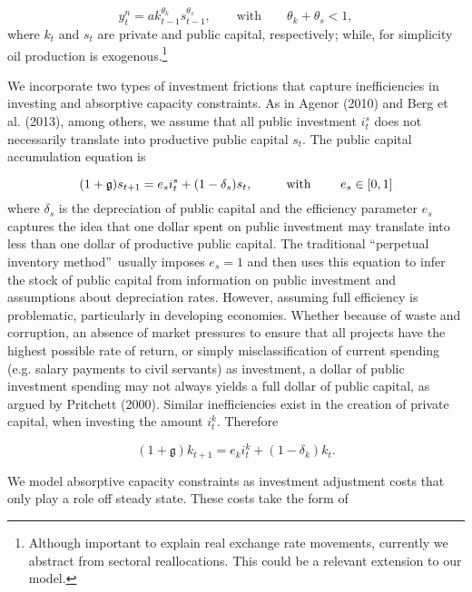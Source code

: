 \documentclass[11pt]{article}
\begin{document}
\begin{equation}
y_{t}^{n}=ak_{t-1}^{\theta _{k}}s_{t-1}^{\theta _{s}},\qquad \text{with}%
\qquad \theta _{k}+\theta _{s}<1,  \label{2}
\end{equation}%
where $k_{t}$ and $s_{t}$ are private and public capital, respectively;
while, for simplicity oil production is exogenous.\footnote{%
Although important to explain real exchange rate movements, currently we
abstract from sectoral reallocations. This could be a relevant extension to
our model.}

We incorporate two types of investment frictions that capture inefficiencies
in investing and absorptive capacity constraints. As in Agenor (2010) and
Berg et al. (2013), among others, we assume that all public investment $%
i_{t}^{s}$ does not necessarily translate into productive public capital $%
s_{t}$. The public capital accumulation equation is

\begin{equation}
(1+\mathfrak{g})s_{t+1}=e_{s}i_{t}^{s}+(1-\delta _{s})s_{t},\text{ \ \ \ \ \
\ \ with \ \ \ \ \ \ }e_{s}\in \lbrack 0,1]  \label{3}
\end{equation}%
where $\delta _{s}$ is the depreciation of public capital and the efficiency
parameter $e_{s}$ captures the idea that one dollar spent on public
investment may translate into less than one dollar of productive public
capital. The traditional \textquotedblleft perpetual inventory
method\textquotedblright\ usually imposes $e_{s}=1$ and then uses this
equation to infer the stock of public capital from information on public
investment and assumptions about depreciation rates. However, assuming full
efficiency is problematic, particularly in developing economies. Whether
because of waste and corruption, an absence of market pressures to ensure
that all projects have the highest possible rate of return, or simply
misclassification of current spending (e.g. salary payments to civil
servants) as investment, a dollar of public investment spending may not
always yields a full dollar of public capital, as argued by Pritchett
(2000). Similar inefficiencies exist in the creation of private capital,
when investing the amount $i_{t}^{k}$. Therefore

\begin{equation}
(1+\mathfrak{g})k_{t+1}=e_{k}i_{t}^{k}+(1-\delta _{k})k_{t}.  \label{4}
\end{equation}

We model absorptive capacity constraints as investment adjustment costs that
only play a role off steady state. These costs take the form of
\end{document}
